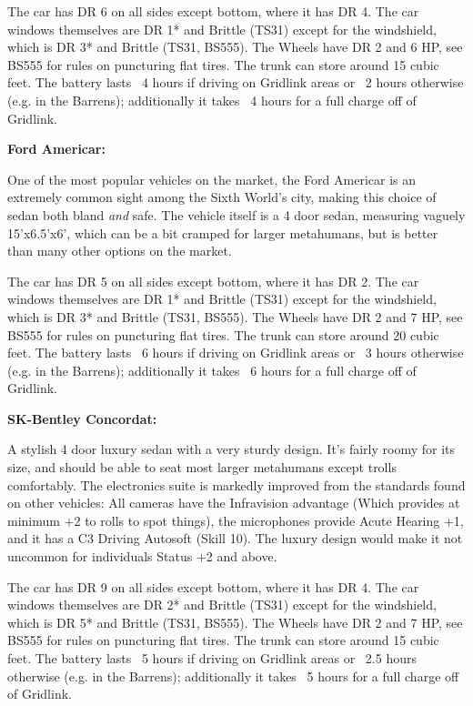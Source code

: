 The car has DR 6 on all sides except bottom, where it has DR 4. The car windows themselves are DR 1* and Brittle (TS31) except for the windshield, which is DR 3* and Brittle (TS31, BS555). The Wheels have DR 2 and 6 HP, see BS555 for rules on puncturing flat tires. The trunk can store around 15 cubic feet. The battery lasts ~4 hours if driving on Gridlink areas or ~2 hours otherwise (e.g. in the Barrens); additionally it takes ~4 hours for a full charge off of Gridlink.

\textbf{Ford Americar:} 

One of the most popular vehicles on the market, the Ford Americar is an extremely common sight among the Sixth World's city, making this choice of sedan both bland \textit{and} safe. The vehicle itself is a 4 door sedan, measuring vaguely 15'x6.5'x6', which can be a bit cramped for larger metahumans, but is better than many other options on the market.

The car has DR 5 on all sides except bottom, where it has DR 2. The car windows themselves are DR 1* and Brittle (TS31) except for the windshield, which is DR 3* and Brittle (TS31, BS555). The Wheels have DR 2 and 7 HP, see BS555 for rules on puncturing flat tires. The trunk can store around 20 cubic feet. The battery lasts ~6 hours if driving on Gridlink areas or ~3 hours otherwise (e.g. in the Barrens); additionally it takes ~6 hours for a full charge off of Gridlink.

\textbf{SK-Bentley Concordat:}

A stylish 4 door luxury sedan with a very sturdy design. It's fairly roomy for its size, and should be able to seat most larger metahumans except trolls comfortably. The electronics suite is markedly improved from the standards found on other vehicles: All cameras have the Infravision advantage (Which provides at minimum +2 to rolls to spot things), the microphones provide Acute Hearing +1, and it has a C3 Driving Autosoft (Skill 10). The luxury design would make it not uncommon for individuals Status +2 and above.

The car has DR 9 on all sides except bottom, where it has DR 4. The car windows themselves are DR 2* and Brittle (TS31) except for the windshield, which is DR 5* and Brittle (TS31, BS555). The Wheels have DR 2 and 7 HP, see BS555 for rules on puncturing flat tires. The trunk can store around 15 cubic feet. The battery lasts ~5 hours if driving on Gridlink areas or ~2.5 hours otherwise (e.g. in the Barrens); additionally it takes ~5 hours for a full charge off of Gridlink.

